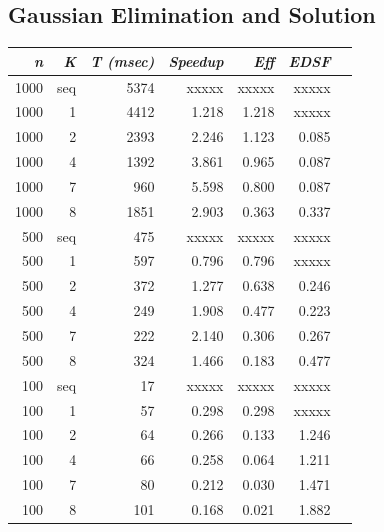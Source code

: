 \documentclass{dependencies/acm_proc_article-sp}
\begin{document}
\subsection{Gaussian Elimination and Solution}


\begin{center}
\begin{tabular}{|r|r|r|r|r|r|r|}\hline
{\em n} & {\em K} & {\em T (msec)} & {\em Speedup} & {\em Eff} & {\em EDSF} \\\hline
1000    & seq     &  5374          & xxxxx        & xxxxx    & xxxxx     \\\hline
1000    & 1       &  4412          & 1.218        & 1.218    & xxxxx     \\\hline
1000    & 2       &  2393          & 2.246        & 1.123    & 0.085     \\\hline
1000    & 4       &  1392          & 3.861        & 0.965    & 0.087     \\\hline
1000    & 7       &  960           & 5.598        & 0.800    & 0.087     \\\hline
1000    & 8       &  1851          & 2.903        & 0.363    & 0.337     \\\hline
500     & seq     &  475           & xxxxx        & xxxxx    & xxxxx     \\\hline
500     & 1       &  597           & 0.796        & 0.796    & xxxxx     \\\hline
500     & 2       &  372           & 1.277        & 0.638    & 0.246     \\\hline
500     & 4       &  249           & 1.908        & 0.477    & 0.223     \\\hline
500     & 7       &  222           & 2.140        & 0.306    & 0.267     \\\hline
500     & 8       &  324           & 1.466        & 0.183    & 0.477     \\\hline
100     & seq     &  17            & xxxxx        & xxxxx    & xxxxx     \\\hline
100     & 1       &  57            & 0.298        & 0.298    & xxxxx     \\\hline
100     & 2       &  64            & 0.266        & 0.133    & 1.246     \\\hline
100     & 4       &  66            & 0.258        & 0.064    & 1.211     \\\hline
100     & 7       &  80            & 0.212        & 0.030    & 1.471     \\\hline
100     & 8       &  101           & 0.168        & 0.021    & 1.882     \\\hline
\end{tabular}
\end{center}
\end{document}
